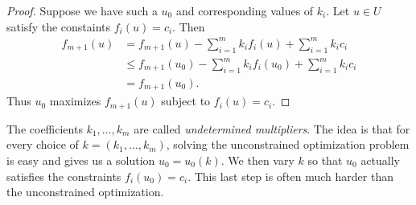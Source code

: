 \begin{proof}
    Suppose we have such a $u_0$ and corresponding values of $k_i$. Let $u \in U$ satisfy the constaints $f_i(u)=c_i$. Then
    \begin{align*}
        f_{m+1}(u) &= f_{m+1}(u)-\sum_{i=1}^m k_i f_i(u) + \sum_{i=1}^m k_ic_i\\
        &\le f_{m+1}(u_0)-\sum_{i=1}^m k_i f_i(u_0) + \sum_{i=1}^m k_ic_i\\
        &= f_{m+1}(u_0).
    \end{align*}
    Thus $u_0$ maximizes $f_{m+1}(u)$ subject to $f_i(u)=c_i$.
\end{proof}
The coefficients $k_1,\ldots, k_m$ are called \emph{undetermined multipliers}. The idea is that for every choice of $k=(k_1,\ldots,k_m)$, solving the unconstrained optimization problem is easy and gives us a solution $u_0 = u_0(k)$. We then vary $k$ so that $u_0$ actually satisfies the constraints $f_i(u_0)=c_i$. This last step is often much harder than the unconstrained optimization. 
